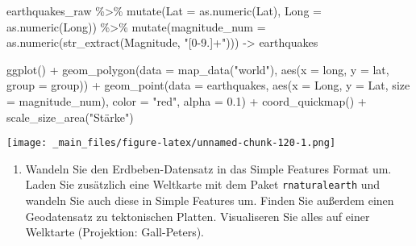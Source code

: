 \documentclass[
  ngerman,
]{article}
\newenvironment{Shaded}{\begin{snugshade}}{\end{snugshade}}
\newcommand{\AttributeTok}[1]{\textcolor[rgb]{0.77,0.63,0.00}{#1}}
\newcommand{\FloatTok}[1]{\textcolor[rgb]{0.00,0.00,0.81}{#1}}
\newcommand{\FunctionTok}[1]{\textcolor[rgb]{0.00,0.00,0.00}{#1}}
\newcommand{\NormalTok}[1]{#1}
\newcommand{\OtherTok}[1]{\textcolor[rgb]{0.56,0.35,0.01}{#1}}
\newcommand{\SpecialCharTok}[1]{\textcolor[rgb]{0.00,0.00,0.00}{#1}}
\newcommand{\StringTok}[1]{\textcolor[rgb]{0.31,0.60,0.02}{#1}}
\providecommand{\tightlist}{%
  \setlength{\itemsep}{0pt}\setlength{\parskip}{0pt}}
\begin{document}
\begin{Shaded}
\begin{Highlighting}[]
\NormalTok{earthquakes\_raw }\SpecialCharTok{\%\textgreater{}\%}
  \FunctionTok{mutate}\NormalTok{(}\AttributeTok{Lat =} \FunctionTok{as.numeric}\NormalTok{(Lat), }\AttributeTok{Long =} \FunctionTok{as.numeric}\NormalTok{(Long)) }\SpecialCharTok{\%\textgreater{}\%}
  \FunctionTok{mutate}\NormalTok{(}\AttributeTok{magnitude\_num =} \FunctionTok{as.numeric}\NormalTok{(}\FunctionTok{str\_extract}\NormalTok{(Magnitude, }\StringTok{"[0{-}9.]+"}\NormalTok{))) }\OtherTok{{-}\textgreater{}}\NormalTok{ earthquakes}

\FunctionTok{ggplot}\NormalTok{() }\SpecialCharTok{+}
  \FunctionTok{geom\_polygon}\NormalTok{(}\AttributeTok{data =} \FunctionTok{map\_data}\NormalTok{(}\StringTok{"world"}\NormalTok{), }\FunctionTok{aes}\NormalTok{(}\AttributeTok{x =}\NormalTok{ long, }\AttributeTok{y =}\NormalTok{ lat, }\AttributeTok{group =}\NormalTok{ group)) }\SpecialCharTok{+}
  \FunctionTok{geom\_point}\NormalTok{(}\AttributeTok{data =}\NormalTok{ earthquakes,}
             \FunctionTok{aes}\NormalTok{(}\AttributeTok{x =}\NormalTok{ Long, }\AttributeTok{y =}\NormalTok{ Lat, }\AttributeTok{size =}\NormalTok{ magnitude\_num),}
             \AttributeTok{color =} \StringTok{"red"}\NormalTok{, }\AttributeTok{alpha =} \FloatTok{0.1}\NormalTok{) }\SpecialCharTok{+}
  \FunctionTok{coord\_quickmap}\NormalTok{() }\SpecialCharTok{+}
  \FunctionTok{scale\_size\_area}\NormalTok{(}\StringTok{"Stärke"}\NormalTok{)}
\end{Highlighting}
\end{Shaded}

\texttt{[image: \_main\_files/figure-latex/unnamed-chunk-120-1.png]}

\begin{enumerate}
\def\labelenumi{\arabic{enumi}.}
\setcounter{enumi}{2}
\tightlist
\item
  Wandeln Sie den Erdbeben-Datensatz in das Simple Features Format um. Laden Sie zusätzlich eine Weltkarte mit dem Paket \texttt{rnaturalearth} und wandeln Sie auch diese in Simple Features um. Finden Sie außerdem einen Geodatensatz zu tektonischen Platten. Visualiseren Sie alles auf einer Welktarte (Projektion: Gall-Peters).
\end{enumerate}
\end{document}
